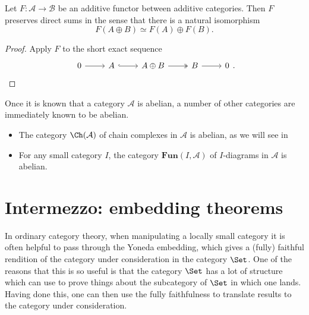 \documentclass[main.tex]{subfiles}
\begin{document}
\begin{corollary}
  Let $F\colon \mathcal{A} \to \mathcal{B}$ be an additive functor between additive categories. Then $F$ preserves direct sums in the sense that there is a natural isomorphism
  \begin{equation*}
    F(A \oplus B) \simeq F(A) \oplus F(B).
  \end{equation*}
\end{corollary}
\begin{proof}
  Apply $F$ to the short exact sequence
  \begin{equation*}
    \begin{tikzcd}
      0
      \arrow[r]
      & A
      \arrow[r, hook]
      & A \oplus B
      \arrow[r, two heads]
      & B
      \arrow[r]
      & 0
    \end{tikzcd}.
  \end{equation*}
\end{proof}

\begin{example}
  \label{eg:examples_of_abelian_categories}
  Once it is known that a category $\mathcal{A}$ is abelian, a number of other categories are immediately known to be abelian.
  \begin{itemize}
    \item The category $\Ch(\mathcal{A})$ of chain complexes in $\mathcal{A}$ is abelian, as we will see in
  
    \item For any small category $I$, the category $\mathbf{Fun}(I, \mathcal{A})$ of $I$-diagrams in $\mathcal{A}$ is abelian.
  \end{itemize}
\end{example}

\section{Intermezzo: embedding theorems}
\label{sec:intermezzo_embedding_theorems}

In ordinary category theory, when manipulating a locally small category it is often helpful to pass through the Yoneda embedding, which gives a (fully) faithful rendition of the category under consideration in the category $\Set$. One of the reasons that this is so useful is that the category $\Set$ has a lot of structure which can use to prove things about the subcategory of $\Set$ in which one lands. Having done this, one can then use the fully faithfulness to translate results to the category under consideration.
\end{document}
